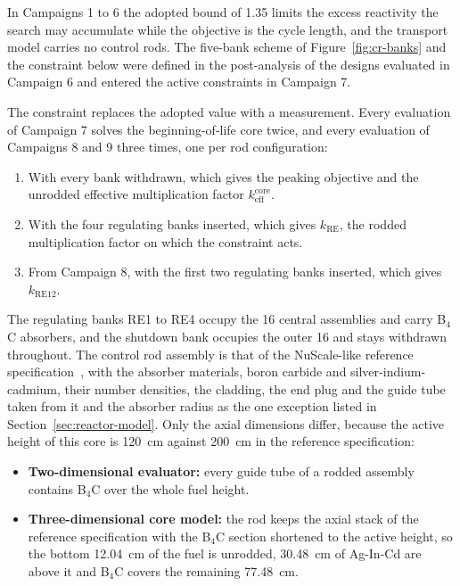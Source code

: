 In Campaigns 1 to 6 the adopted bound of 1.35 limits the excess
reactivity the search may accumulate while the objective is the cycle
length, and the transport model carries no control rods. The five-bank scheme
of Figure~\ref{fig:cr-banks} and the constraint below were defined in
the post-analysis of the designs evaluated in Campaign 6 and entered the
active constraints in Campaign 7.

The constraint replaces the adopted value with a measurement. Every
evaluation of Campaign 7 solves the beginning-of-life core twice, and
every evaluation of Campaigns 8 and 9 three times, one per rod
configuration:

\begin{enumerate}
  \item With every bank withdrawn, which gives the peaking objective
        and the unrodded effective multiplication factor $k_\mathrm{eff}^\mathrm{core}$.

  \item With the four regulating banks inserted, which gives
        $k_\mathrm{RE}$, the rodded multiplication factor on which the constraint acts.

  \item From Campaign 8, with the first two regulating banks inserted,
        which gives $k_\mathrm{RE12}$.
\end{enumerate}

The regulating banks RE1 to RE4 occupy the 16 central assemblies and
carry B$_4$C absorbers, and the shutdown bank occupies the outer 16 and
stays withdrawn throughout. The control rod assembly is that of the NuScale-like reference
specification~\cite{fridman_nuscale_benchmark_2023}, with the absorber
materials, boron carbide and silver-indium-cadmium, their number
densities, the cladding, the end plug and the guide tube taken from it
and the absorber radius as the one exception listed in
Section~\ref{sec:reactor-model}. Only the axial dimensions differ,
because the active height of this core is \SI{120}{cm} against
\SI{200}{cm} in the reference specification:

\begin{itemize}
  \item \textbf{Two-dimensional evaluator:} every guide tube of a rodded
        assembly contains B$_4$C over the whole fuel height.

  \item \textbf{Three-dimensional core model:} the rod keeps the axial
        stack of the reference specification with the B$_4$C section
        shortened to the active height, so the bottom \SI{12.04}{cm} of
        the fuel is unrodded, \SI{30.48}{cm} of Ag-In-Cd are above it and
        B$_4$C covers the remaining \SI{77.48}{cm}.
\end{itemize}


